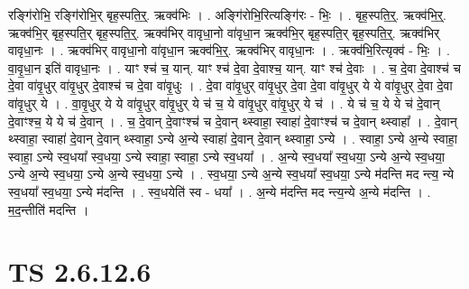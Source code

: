 \documentclass[17pt]{extarticle}
\begin{document}
रङ्गि॑रोभि॒ रङ्गि॑रोभि॒र् बृह॒स्पति॒र्॒. ऋक्व॑भिः । . अङ्गि॑रोभि॒रित्यङ्गि॑रः - भिः॒ । . बृह॒स्पति॒र्॒. ऋक्व॑भि॒र्॒. ऋक्व॑भि॒र् बृह॒स्पति॒र् बृह॒स्पति॒र्॒. ऋक्व॑भिर् वावृधा॒नो वा॑वृधा॒न ऋक्व॑भि॒र् बृह॒स्पति॒र् बृह॒स्पति॒र्॒. ऋक्व॑भिर् वावृधा॒नः । . ऋक्व॑भिर् वावृधा॒नो वा॑वृधा॒न ऋक्व॑भि॒र्॒. ऋक्व॑भिर् वावृधा॒नः । . ऋक्व॑भि॒रित्यृक्व॑ - भिः॒ । . वा॒वृ॒धा॒न इति॑ वावृधा॒नः । . याꣳ श्च॑ च॒ यान्. याꣳ श्च॑ दे॒वा दे॒वाश्च॒ यान्. याꣳ श्च॑ दे॒वाः । . च॒ दे॒वा दे॒वाश्च॑ च दे॒वा वा॑वृ॒धुर् वा॑वृ॒धुर् दे॒वाश्च॑ च दे॒वा वा॑वृ॒धुः । . दे॒वा वा॑वृ॒धुर् वा॑वृ॒धुर् दे॒वा दे॒वा वा॑वृ॒धुर् ये ये वा॑वृ॒धुर् दे॒वा दे॒वा वा॑वृ॒धुर् ये । . वा॒वृ॒धुर् ये ये वा॑वृ॒धुर् वा॑वृ॒धुर् ये च॑ च॒ ये वा॑वृ॒धुर् वा॑वृ॒धुर् ये च॑ । . ये च॑ च॒ ये ये च॑ दे॒वान् दे॒वाꣳश्च॒ ये ये च॑ दे॒वान् । . च॒ दे॒वान् दे॒वाꣳश्च॑ च दे॒वान् थ्स्वाहा॒ स्वाहा॑ दे॒वाꣳश्च॑ च दे॒वान् थ्स्वाहा᳚ । . दे॒वान् थ्स्वाहा॒ स्वाहा॑ दे॒वान् दे॒वान् थ्स्वाहा॒ ऽन्ये अ॒न्ये स्वाहा॑ दे॒वान् दे॒वान् थ्स्वाहा॒ ऽन्ये । . स्वाहा॒ ऽन्ये अ॒न्ये स्वाहा॒ स्वाहा॒ ऽन्ये स्व॒धया᳚ स्व॒धया॒ ऽन्ये स्वाहा॒ स्वाहा॒ ऽन्ये स्व॒धया᳚ । . अ॒न्ये स्व॒धया᳚ स्व॒धया॒ ऽन्ये अ॒न्ये स्व॒धया॒ ऽन्ये अ॒न्ये स्व॒धया॒ ऽन्ये अ॒न्ये स्व॒धया॒ ऽन्ये । . स्व॒धया॒ ऽन्ये अ॒न्ये स्व॒धया᳚ स्व॒धया॒ ऽन्ये म॑दन्ति मद न्त्य॒ न्ये स्व॒धया᳚ स्व॒धया॒ ऽन्ये म॑दन्ति । . स्व॒धयेति॑ स्व - धया᳚ । . अ॒न्ये म॑दन्ति मद न्त्य॒न्ये अ॒न्ये म॑दन्ति । . म॒द॒न्तीति॑ मदन्ति । \newline
\pagebreak
{}
\section*{ TS 2.6.12.6 }
\end{document}
